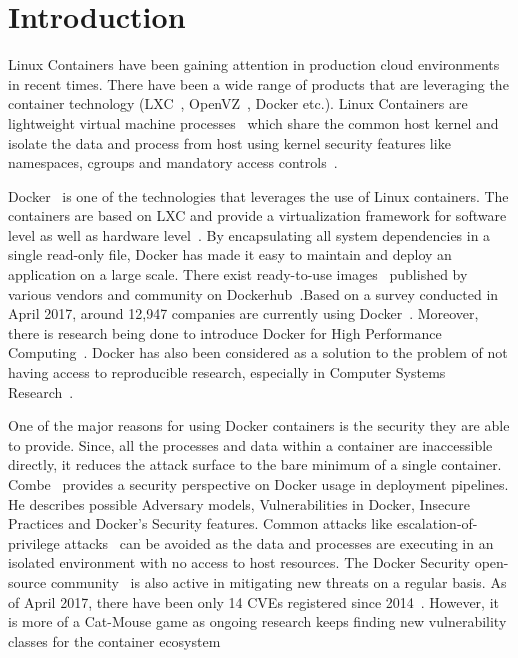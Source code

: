 \section{Introduction}

Linux Containers have been gaining attention in production cloud environments in recent times. There have been a wide range of products that are leveraging the container technology (LXC~\cite{lxc1}, OpenVZ~\cite{openvz}, Docker\cite{dockerarticle} etc.). Linux Containers are lightweight virtual machine processes~\cite{containerperformance} which share the common host kernel and isolate the data and process from host using kernel security features like namespaces, cgroups and mandatory access controls~\cite{hardenlinuxcontainer, dockerinc.2016}.

Docker~\cite{docker} is one of the technologies that leverages the use of Linux containers. The containers are based on LXC\cite{lxc1} and provide a virtualization framework for software level as well as hardware level~\cite{dockersaas}. By encapsulating all system dependencies in a single read-only file, Docker has made it easy to maintain and deploy an application on a large scale. There exist ready-to-use images~\cite{dockerimages} published by various vendors and community on Dockerhub~\cite{dockerhub}.Based on a survey conducted in April 2017, around 12,947 companies are currently using Docker~\cite{survey1}. Moreover, there is research being done to introduce Docker for High Performance Computing~\cite{dockerHPC}. Docker has also been considered as a solution to the problem of not having access to reproducible research, especially in Computer Systems Research~\cite{collberg2014,dockerrepresearch2014, hung2016guidock}.

One of the major reasons for using Docker containers is the security they are able to provide. Since, all the processes and data within a container are inaccessible directly, it reduces the attack surface to the bare minimum of a single container. Combe~\cite{combe} provides a security perspective on Docker usage in deployment pipelines. He describes possible Adversary models, Vulnerabilities in Docker, Insecure Practices and Docker's Security features. Common attacks like escalation-of-privilege attacks~\cite{jessehertz2016} can be avoided as the data and processes are executing in an isolated environment with no access to host resources. The Docker Security open-source community~\cite{dockeropensource} is also active in mitigating new threats on a regular basis. As of April 2017, there have been only 14 CVEs registered since 2014~\cite{cvelist}. However, it is more of a Cat-Mouse game as ongoing research keeps finding new vulnerability classes for the container ecosystem~\cite{combecontainers}

